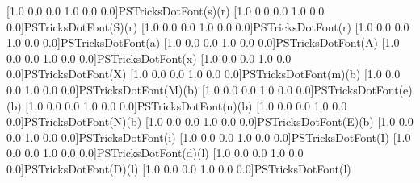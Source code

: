 [1.0 0.0 0.0 1.0 0.0 0.0]{PSTricksDotFont}{(s)}{(r)}
[1.0 0.0 0.0 1.0 0.0 0.0]{PSTricksDotFont}{(S)}{(r)}
[1.0 0.0 0.0 1.0 0.0 0.0]{PSTricksDotFont}{(r)}
[1.0 0.0 0.0 1.0 0.0 0.0]{PSTricksDotFont}{(a)}
[1.0 0.0 0.0 1.0 0.0 0.0]{PSTricksDotFont}{(A)}
[1.0 0.0 0.0 1.0 0.0 0.0]{PSTricksDotFont}{(x)}
[1.0 0.0 0.0 1.0 0.0 0.0]{PSTricksDotFont}{(X)}
[1.0 0.0 0.0 1.0 0.0 0.0]{PSTricksDotFont}{(m)}{(b)}
[1.0 0.0 0.0 1.0 0.0 0.0]{PSTricksDotFont}{(M)}{(b)}
[1.0 0.0 0.0 1.0 0.0 0.0]{PSTricksDotFont}{(e)}{(b)}
[1.0 0.0 0.0 1.0 0.0 0.0]{PSTricksDotFont}{(n)}{(b)}
[1.0 0.0 0.0 1.0 0.0 0.0]{PSTricksDotFont}{(N)}{(b)}
[1.0 0.0 0.0 1.0 0.0 0.0]{PSTricksDotFont}{(E)}{(b)}
[1.0 0.0 0.0 1.0 0.0 0.0]{PSTricksDotFont}{(i)}
[1.0 0.0 0.0 1.0 0.0 0.0]{PSTricksDotFont}{(I)}
[1.0 0.0 0.0 1.0 0.0 0.0]{PSTricksDotFont}{(d)}{(l)}
[1.0 0.0 0.0 1.0 0.0 0.0]{PSTricksDotFont}{(D)}{(l)}
[1.0 0.0 0.0 1.0 0.0 0.0]{PSTricksDotFont}{(l)}

